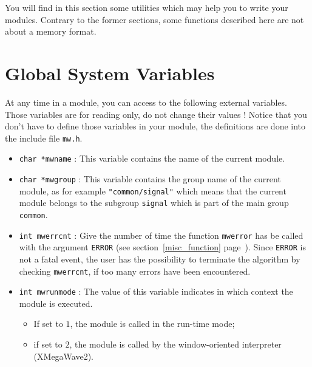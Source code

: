 %
%

You will find in this section some utilities which may help you to write your modules. 
Contrary to the former sections, some functions described here are not about a memory 
format. 

\section{Global System Variables}


\label{misc_glob-sys-var}

At any time in a module, you can access to the following external variables.
Those variables are for reading only, do not change their values !
Notice that you don't have to define those variables in your module, the
definitions are done into the include file \verb+mw.h+.

\begin{itemize}
\item \verb+char *mwname+ :
This variable contains the name of the current module.

\item \verb+char *mwgroup+ :
This variable contains the group name of the current module, as for example \verb+"common/signal"+ which means that the current module belongs to the subgroup \verb+signal+ which is part of the main group \verb+common+.

\item \verb+int mwerrcnt+ :
Give the number of time the function \verb+mwerror+ has be called with the
argument \verb+ERROR+ (see section~\ref{misc_function} page~\pageref{misc_function}).
Since \verb+ERROR+ is not a fatal event, the user has the possibility to terminate the algorithm by checking \verb+mwerrcnt+, if too many errors have been
encountered.

\item \verb+int mwrunmode+ :
The value of this variable indicates in which context the module is executed.
\begin{itemize}
\item If set to $1$, the module is called in the run-time mode;
\item if set to $2$, the module is called by the window-oriented interpreter (XMegaWave2).
\end{itemize}


\end{itemize}

